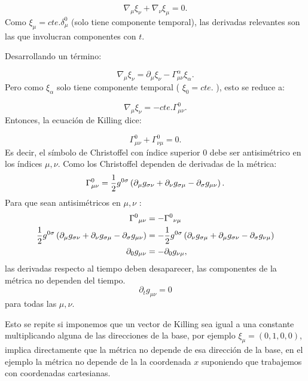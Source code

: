 \begin{equation}
    \nabla_\mu \xi_\nu+\nabla_\nu \xi_\mu=0.
\end{equation}
Como $\xi_\mu=cte. \delta_\mu^0$ (solo tiene componente temporal), las derivadas relevantes son las que involucran componentes con $t$.

Desarrollando un término:

\begin{equation}
    \nabla_\mu \xi_\nu=\partial_\mu \xi_\nu-\Gamma_{\mu \nu}^\alpha \xi_\alpha.
\end{equation}
Pero como $\xi_\alpha$ solo tiene componente temporal ( $\xi_0=cte.$ ), esto se reduce a:

\begin{equation}
    \nabla_\mu \xi_\nu=-cte.\Gamma_{\mu \nu}^0   . 
\end{equation}
Entonces, la ecuación de Killing dice:

\begin{equation}
    \Gamma_{\mu \nu}^0+\Gamma_{\nu \mu}^0=0   . 
\end{equation}
Es decir, el símbolo de Christoffel con índice superior 0 debe ser antisimétrico en los índices $\mu, \nu$.
Como los Christoffel dependen de derivadas de la métrica:
\begin{equation}
    \Gamma_{\mu \nu}^0=\frac{1}{2} g^{0 \sigma}\left(\partial_{\mu} g_{ \sigma \nu}+\partial_{\nu} g_{ \sigma \mu}-\partial_{\sigma} g_{\mu \nu}\right).
\end{equation}
Para que sean antisimétricos en $\mu, \nu$ :
\begin{equation}
\begin{aligned}
    \Gamma^0{}_{\mu \nu} & =-\Gamma^0{}_{\nu \mu} \\
    \frac{1}{2} g^{0 \sigma}\left(\partial_{\mu} g_{ \sigma \nu}+\partial_{\nu} g_{ \sigma \mu}-\partial_{\sigma} g_{\mu \nu}\right) & = - \frac{1}{2} g^{0 \sigma}\left(\partial_{\nu} g_{ \sigma \mu}+\partial_{\mu} g_{ \sigma \nu}-\partial_{\sigma} g_{\nu \mu}\right)  \\
    \partial_{0} g_{\mu \nu}& = -\partial_{0} g_{\nu \mu }, \\
\end{aligned}    
\end{equation}
las derivadas respecto al tiempo deben desaparecer, las componentes de la métrica no dependen del tiempo.
\begin{equation}
    \partial_t g_{\mu \nu}=0    
\end{equation}
para todas las $\mu, \nu$.
\begin{note}
Esto se repite si imponemos que un vector de Killing sea igual a una constante multiplicando alguna de las direcciones de la base, por ejemplo $\xi_\mu=(0,1,0,0)$, implica directamente que la métrica no depende de esa dirección de la base, en el ejemplo la métrica no depende de la la coordenada $x$ suponiendo que trabajemos con coordenadas cartesianas. 
\end{note}